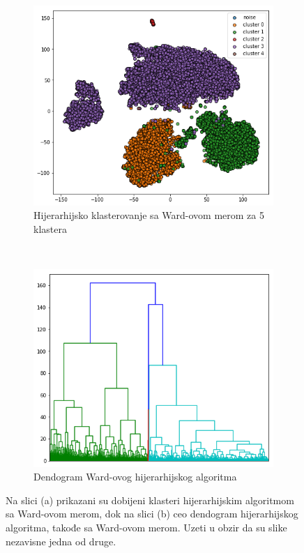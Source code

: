 \documentclass[a4paper]{article}
\begin{document}
\begin{figure}[H]
	\centering
	\begin{subfigure}[normla]{0.4\textwidth}
		\includegraphics[scale=0.3]{ward_clustering}
		\caption{Hijerarhijsko klasterovanje sa Ward-ovom merom za 5 klastera}
		\label{ward_clustering}
	\end{subfigure}
	~
	\begin{subfigure}[normla]{0.4\textwidth}
		\includegraphics[scale=0.3]{dendogram}
		\caption{Dendogram Ward-ovog hijerarhijskog algoritma}
		\label{dendogram}
	\end{subfigure}
		\caption{Na slici (a) prikazani su dobijeni klasteri hijerarhijskim algoritmom sa Ward-ovom merom, dok na slici (b) ceo dendogram hijerarhijskog algoritma, takođe sa Ward-ovom merom. Uzeti u obzir da su slike nezavisne jedna od druge.}
\label{spektral_nmf_grp1_cosine}
\end{figure}
\end{document}
